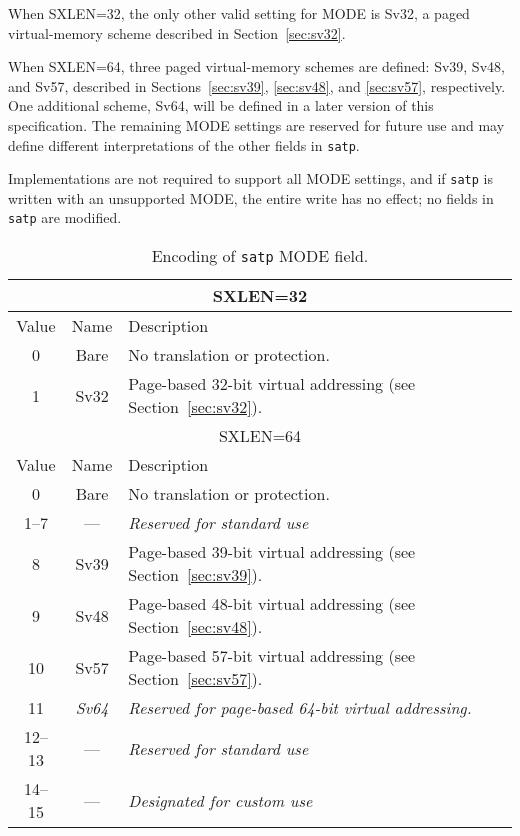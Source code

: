 When SXLEN=32, the only other valid setting for MODE is Sv32, a paged
virtual-memory scheme described in Section~\ref{sec:sv32}.

When SXLEN=64, three paged virtual-memory schemes are defined: Sv39, Sv48, and Sv57,
described in Sections~\ref{sec:sv39}, \ref{sec:sv48}, and \ref{sec:sv57}, respectively.
One additional scheme, Sv64, will be defined in a later version
of this specification.  The remaining MODE settings are reserved
for future use and may define different interpretations of the other fields in
{\tt satp}.

Implementations are not required to support all MODE settings,
and if {\tt satp} is written with an unsupported MODE, the entire write has
no effect; no fields in {\tt satp} are modified.

\begin{table}[h]
\begin{center}
\begin{tabular}{|c|c|l|}
\hline
\multicolumn{3}{|c|}{SXLEN=32} \\
\hline
Value  & Name & Description \\
\hline
0       & Bare  & No translation or protection. \\
1       & Sv32  & Page-based 32-bit virtual addressing (see Section~\ref{sec:sv32}). \\
\hline \hline
\multicolumn{3}{|c|}{SXLEN=64} \\
\hline
Value  & Name & Description \\
\hline
0       & Bare  & No translation or protection. \\
1--7    & ---   & {\em Reserved for standard use} \\
8       & Sv39  & Page-based 39-bit virtual addressing (see Section~\ref{sec:sv39}). \\
9       & Sv48  & Page-based 48-bit virtual addressing (see Section~\ref{sec:sv48}). \\
10      & Sv57  & Page-based 57-bit virtual addressing (see Section~\ref{sec:sv57}). \\
11      & {\em Sv64} & {\em Reserved for page-based 64-bit virtual addressing.} \\
12--13  & ---   & {\em Reserved for standard use} \\
14--15  & ---   & {\em Designated for custom use} \\
\hline
\end{tabular}
\end{center}
\caption{Encoding of {\tt satp} MODE field.}
\label{tab:satp-mode}
\end{table}

